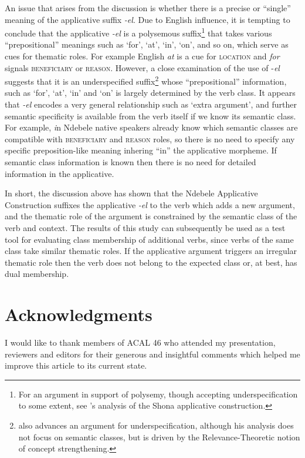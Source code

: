 \documentclass[output=paper]{langsci/langscibook}
\begin{document}
 An issue that arises from the discussion is whether there is a precise or “single” meaning of the applicative suffix \textit{-el}. Due to English influence, it is tempting to conclude that the applicative \textit{-el} is a polysemous suffix\footnote{For an argument in support of polysemy, though accepting underspecification to some extent, see ’s analysis of the Shona applicative construction.} that takes various “prepositional” meanings such as ‘for’, ‘at’, ‘in’, ‘on’, and so on, which serve as cues for thematic roles. For example English \textit{at} is a cue for \textsc{location} and \textit{for} signals \textsc{beneficiary} or \textsc{reason}. However, a close examination of the use of -\textit{el} suggests that it is an underspecified suffix\footnote{\citet{Marten2002} also advances an argument for underspecification, although his analysis does not focus on semantic classes, but is driven by the Relevance-Theoretic notion of concept strengthening.} whose “prepositional” information, such as ‘for’, ‘at’, ‘in’ and ‘on’ is largely determined by the verb class. It appears that \textit{-el} encodes a very general relationship such as ‘extra argument’, and further semantic specificity is available from the verb itself if we know its semantic class. For example, \textit{i}n Ndebele native speakers already know which semantic classes are compatible with \textsc{beneficiary} and \textsc{reason} roles, so there is no need to specify any specific preposition-like meaning inhering “in” the applicative morpheme. If semantic class information is known then there is no need for detailed information in the applicative. 

 In short, the discussion above has shown that the Ndebele Applicative Construction suffixes the applicative \textit{-el} to the verb which adds a new argument, and the thematic role of the argument is constrained by the semantic class of the verb and context. The results of this study can subsequently be used as a test tool for evaluating class membership of additional verbs, since verbs of the same class take similar thematic roles. If the applicative argument triggers an irregular thematic role then the verb does not belong to the expected class or, at best, has dual membership.

\section*{Acknowledgments}

I would like to thank members of ACAL 46 who attended my presentation, reviewers and editors for their generous and insightful comments which helped me improve this article to its current state.
\end{document}
